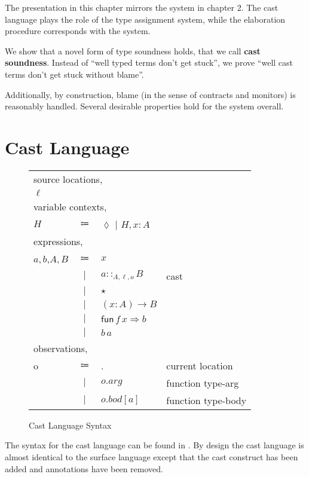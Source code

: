 The presentation in this chapter mirrors the system in chapter 2.
The cast language plays the role of the type assignment system, while the elaboration procedure corresponds with the \bidir system.
 
We show that a novel form of type soundness holds, that we call \textbf{cast soundness}.
Instead of ``well typed terms don't get stuck'', we prove ``well cast terms don't get stuck without blame''.
 
Additionally, by construction, blame (in the sense of contracts and monitors) is reasonably handled.
Several desirable properties hold for the system overall. 
 
\section{Cast Language}
 
\begin{figure}
\begin{tabular}{lcll}
\multicolumn{4}{l}{source locations,}\tabularnewline
$\ensuremath{\ell}$ &  &  & \tabularnewline
\multicolumn{4}{l}{variable contexts,}\tabularnewline
$H$ & $\Coloneqq$ & $\lozenge$ $|$ $H,x:A$ & \tabularnewline
\multicolumn{4}{l}{expressions,}\tabularnewline
$a,b$,$A,B$ & $\Coloneqq$ & $x$ & \tabularnewline
& $|$ & $a::_{A,\ensuremath{\ell},o}B$ & cast\tabularnewline
& $|$ & $\star$ & \tabularnewline
& $|$ & $\left(x:A\right)\rightarrow B$ & \tabularnewline
& $|$ & $\mathsf{fun}\,f\,x\Rightarrow b$ & \tabularnewline
& $|$ & $b\,a$ & \tabularnewline
\multicolumn{4}{l}{observations,}\tabularnewline
o & $\Coloneqq$ & . & current location\tabularnewline
& $|$ & $o.arg$ & function type-arg\tabularnewline
& $|$ & $o.bod[a]$ & function type-body\tabularnewline
\end{tabular}
 
 
 
\caption{Cast Language Syntax}
\label{fig:cast-pre-syntax}
\end{figure}
 
The syntax for the cast language can be found in .
By design the cast language is almost identical to the surface language except that the cast construct has been added and annotations have been removed.
 
